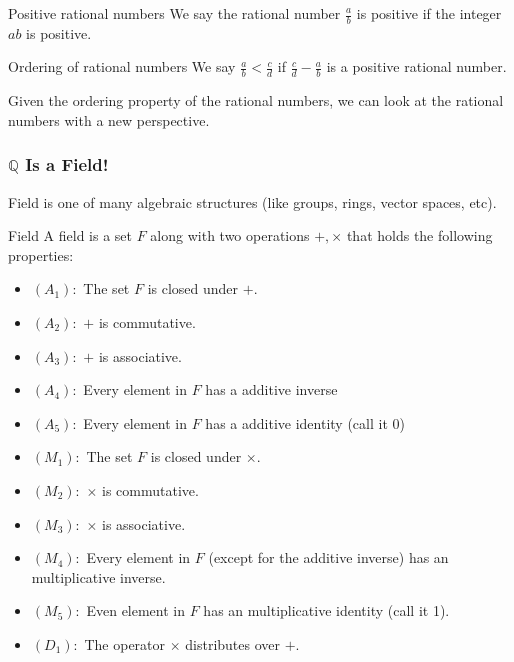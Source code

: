 \begin{defbox}{Positive rational numbers}
	We say the rational number $ \frac{a}{b} $ is positive if the integer $ ab $ is positive. 
\end{defbox}

\begin{defbox}{Ordering of rational numbers}
	We say $ \frac{a}{b} < \frac{c}{d}$ if $ \frac{c}{d} - \frac{a}{b} $ is a positive rational number.
\end{defbox}

Given the ordering property of the rational numbers, we can look at the rational numbers with a new perspective.


\subsubsection{$ \mathbb{Q} $ Is a Field!}
Field is one of many algebraic structures (like groups, rings, vector spaces, etc). 

\begin{defbox}{Field}
	A field is a set $ F $ along with two operations $ +, \times $ that holds the following properties:
	\begin{itemize}
		\item $ (A_1): $ The set $ F $ is closed under $ + $. 
		\item $ (A_2): $ $ + $ is commutative.
		\item $ (A_3): $ $ + $ is associative.
		\item $ (A_4): $ Every element in $ F $ has a additive inverse
		\item $ (A_5): $ Every element in $ F $ has a additive identity (call it 0)
		\item $ (M_1): $ The set $ F $ is closed under $ \times $.
		\item $ (M_2): $ $ \times $ is commutative.
		\item $ (M_3): $ $ \times $ is associative.
		\item $ (M_4): $ Every element in $ F $ (except for the additive inverse) has an multiplicative inverse.
		\item $ (M_5): $ Even element in $ F $ has an multiplicative identity (call it 1).
		\item $ (D_1): $ The operator $ \times $ distributes over $ + $.
	\end{itemize}
\end{defbox}

